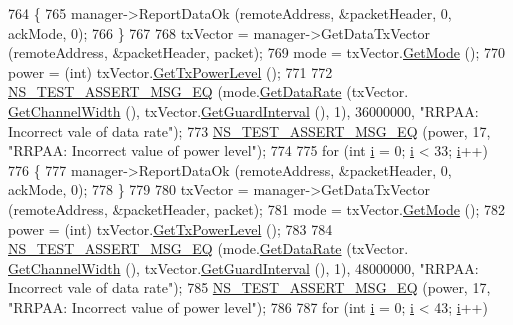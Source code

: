 \begin{DoxyCode}
764     \{
765       manager->ReportDataOk (remoteAddress, &packetHeader, 0, ackMode, 0);
766     \}
767 
768   txVector = manager->GetDataTxVector (remoteAddress, &packetHeader, packet);
769   mode = txVector.\hyperlink{classns3_1_1WifiTxVector_a497b1f11cad4b8b26251dfa07c9ad1d6}{GetMode} ();
770   power = (int) txVector.\hyperlink{classns3_1_1WifiTxVector_a7c98bd9609ff1c5cefa6e22d6908a2fe}{GetTxPowerLevel} ();
771 
772   \hyperlink{group__testing_ga2a9d78cffb3db8e867c35fff0b698cf5}{NS\_TEST\_ASSERT\_MSG\_EQ} (mode.\hyperlink{classns3_1_1WifiMode_adcfbe150f69da720db23387f733b8a52}{GetDataRate} (txVector.
      \hyperlink{classns3_1_1WifiTxVector_a1f8bfa51778a3e217581eb665f059564}{GetChannelWidth} (), txVector.\hyperlink{classns3_1_1WifiTxVector_ab80c0fd812542ef337a6cace4f64db63}{GetGuardInterval} (), 1), 36000000, \textcolor{stringliteral}{"RRPAA:
       Incorrect vale of data rate"});
773   \hyperlink{group__testing_ga2a9d78cffb3db8e867c35fff0b698cf5}{NS\_TEST\_ASSERT\_MSG\_EQ} (power, 17, \textcolor{stringliteral}{"RRPAA: Incorrect value of power level"});
774 
775   \textcolor{keywordflow}{for} (\textcolor{keywordtype}{int} \hyperlink{bernuolliDistribution_8m_a6f6ccfcf58b31cb6412107d9d5281426}{i} = 0; \hyperlink{bernuolliDistribution_8m_a6f6ccfcf58b31cb6412107d9d5281426}{i} < 33; \hyperlink{bernuolliDistribution_8m_a6f6ccfcf58b31cb6412107d9d5281426}{i}++)
776     \{
777       manager->ReportDataOk (remoteAddress, &packetHeader, 0, ackMode, 0);
778     \}
779 
780   txVector = manager->GetDataTxVector (remoteAddress, &packetHeader, packet);
781   mode = txVector.\hyperlink{classns3_1_1WifiTxVector_a497b1f11cad4b8b26251dfa07c9ad1d6}{GetMode} ();
782   power = (int) txVector.\hyperlink{classns3_1_1WifiTxVector_a7c98bd9609ff1c5cefa6e22d6908a2fe}{GetTxPowerLevel} ();
783 
784   \hyperlink{group__testing_ga2a9d78cffb3db8e867c35fff0b698cf5}{NS\_TEST\_ASSERT\_MSG\_EQ} (mode.\hyperlink{classns3_1_1WifiMode_adcfbe150f69da720db23387f733b8a52}{GetDataRate} (txVector.
      \hyperlink{classns3_1_1WifiTxVector_a1f8bfa51778a3e217581eb665f059564}{GetChannelWidth} (), txVector.\hyperlink{classns3_1_1WifiTxVector_ab80c0fd812542ef337a6cace4f64db63}{GetGuardInterval} (), 1), 48000000, \textcolor{stringliteral}{"RRPAA:
       Incorrect vale of data rate"});
785   \hyperlink{group__testing_ga2a9d78cffb3db8e867c35fff0b698cf5}{NS\_TEST\_ASSERT\_MSG\_EQ} (power, 17, \textcolor{stringliteral}{"RRPAA: Incorrect value of power level"});
786 
787   \textcolor{keywordflow}{for} (\textcolor{keywordtype}{int} \hyperlink{bernuolliDistribution_8m_a6f6ccfcf58b31cb6412107d9d5281426}{i} = 0; \hyperlink{bernuolliDistribution_8m_a6f6ccfcf58b31cb6412107d9d5281426}{i} < 43; \hyperlink{bernuolliDistribution_8m_a6f6ccfcf58b31cb6412107d9d5281426}{i}++)

\end{DoxyCode}
